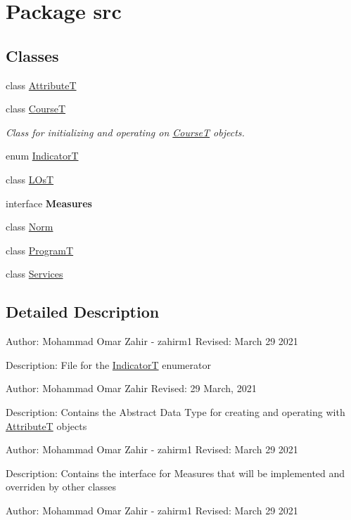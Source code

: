 \hypertarget{namespacesrc}{}\section{Package src}
\label{namespacesrc}
\subsection*{Classes}
\begin{DoxyCompactItemize}
\item 
class \hyperlink{classsrc_1_1AttributeT}{AttributeT}
\item 
class \hyperlink{classsrc_1_1CourseT}{CourseT}
\begin{DoxyCompactList}\small\item\em Class for initializing and operating on \hyperlink{classsrc_1_1CourseT}{CourseT} objects. \end{DoxyCompactList}\item 
enum \hyperlink{enumsrc_1_1IndicatorT}{IndicatorT}
\item 
class \hyperlink{classsrc_1_1LOsT}{L\+OsT}
\item 
interface {\bfseries Measures}
\item 
class \hyperlink{classsrc_1_1Norm}{Norm}
\item 
class \hyperlink{classsrc_1_1ProgramT}{ProgramT}
\item 
class \hyperlink{classsrc_1_1Services}{Services}
\end{DoxyCompactItemize}


\subsection{Detailed Description}
Author\+: Mohammad Omar Zahir -\/ zahirm1 Revised\+: March 29 2021

Description\+: File for the \hyperlink{enumsrc_1_1IndicatorT}{IndicatorT} enumerator

Author\+: Mohammad Omar Zahir Revised\+: 29 March, 2021

Description\+: Contains the Abstract Data Type for creating and operating with \hyperlink{classsrc_1_1AttributeT}{AttributeT} objects

Author\+: Mohammad Omar Zahir -\/ zahirm1 Revised\+: March 29 2021

Description\+: Contains the interface for Measures that will be implemented and overriden by other classes

Author\+: Mohammad Omar Zahir -\/ zahirm1 Revised\+: March 29 2021

